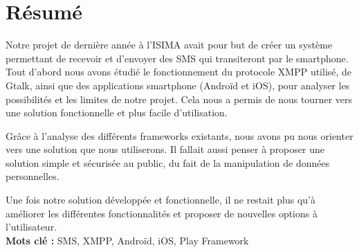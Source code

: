 \cleardoublepage



\chapter*{Résumé}

\thispagestyle{empty}


Notre projet de dernière année à l'ISIMA avait pour but de créer un système permettant de recevoir et d'envoyer des SMS qui transiteront par le smartphone.
\\


Tout d'abord nous avons étudié le fonctionnement du protocole XMPP utilisé, de Gtalk, ainsi que des applications smartphone (Androïd et iOS), pour analyser les possibilités et les limites de notre projet.
Cela nous a permis de nous tourner vers une solution fonctionnelle et plus facile d'utilisation.

Grâce à l'analyse des différents frameworks existants, nous avons pu nous orienter vers une solution que nous utiliserons.
Il fallait aussi penser à proposer une solution simple et sécurisée au public, du fait de la manipulation de données personnelles.

Une fois notre solution développée et fonctionnelle, il ne restait plus qu'à améliorer les différentes fonctionnalités et proposer de nouvelles options à l'utilisateur.
\\



\textbf{Mots clé : }
SMS, XMPP, Androïd, iOS, Play Framework